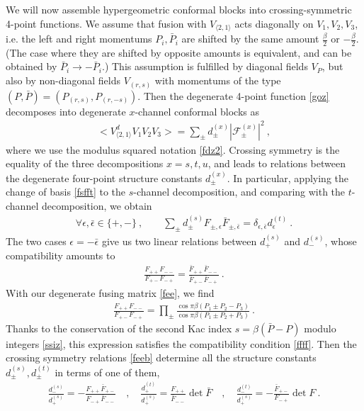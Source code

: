 \documentclass[12pt, a4paper]{article}
\theoremstyle{break}
\begin{document}
We will now assemble hypergeometric conformal blocks into crossing-symmetric 4-point functions. We assume that fusion with $V_{\langle 2,1\rangle}$ acts diagonally on $V_1,V_2,V_3$, i.e. the left and right momentums $P_i,\bar P_i$ are shifted by the same amount $\frac{\beta}{2}$ or $-\frac{\beta}{2}$. (The case where they are shifted by opposite amounts is equivalent, and can be obtained by $\bar P_i\to -\bar P_i$.) This assumption is fulfilled by diagonal fields $V_P$, but also by non-diagonal fields $V_{(r,s)}$ with momentums of the type $(P,\bar P)= (P_{(r,s)},P_{(r,-s)})$. 
Then the degenerate 4-point function \eqref{goz} decomposes into degenerate $x$-channel conformal blocks as 
\begin{align}
 \Big<V_{\langle 2,1\rangle}^dV_{1}V_{2}V_{3}\Big> 
 = \sum_\pm d^{(x)}_\pm \left|\mathcal{F}^{(x)}_\pm \right|^2  
 \ ,
\end{align}
where we use the modulus squared notation \eqref{fdz2}.
Crossing symmetry is the equality of the three decompositions $x=s,t,u$, and leads to relations between the degenerate four-point structure constants $d^{(x)}_\pm$. In particular, applying the change of basis \eqref{fsfft} to the $s$-channel decomposition, and comparing with the $t$-channel decomposition, we obtain 
\begin{align}
 \forall \epsilon,\bar\epsilon \in \{+,-\}\ , \qquad \sum_\pm d_\pm^{(s)} F_{\pm,\epsilon}\bar F_{\pm, \bar\epsilon} = \delta_{\epsilon,\bar\epsilon} d_\epsilon^{(t)}\ . 
 \label{feeb}
\end{align}
The two cases $\epsilon = -\bar\epsilon$ give us two linear relations between $d^{(s)}_+$ and $d^{(s)}_-$, whose compatibility amounts to 
\begin{align}
 \frac{F_{++}F_{--}}{F_{+-}F_{-+}} = \frac{\bar F_{++}\bar F_{--}}{\bar F_{+-}\bar F_{-+}}\ .
 \label{ffff}
\end{align}
With our degenerate fusing matrix \eqref{fee}, we find 
\begin{align}
 \frac{F_{++}F_{--}}{F_{+-}F_{-+}} = \prod_\pm \frac{\cos \pi \beta(P_1\pm P_2-P_3)}{\cos \pi \beta(P_1\pm P_2+P_3)}\ . 
\end{align}
Thanks to the conservation of the second Kac index $s=\beta(\bar P-P)$ modulo integers \eqref{ssiz}, this expression satisfies the compatibility condition \eqref{ffff}. Then the crossing symmetry relations \eqref{feeb} determine all the structure constants $d^{(s)}_\pm,d^{(t)}_\pm$ in terms of one of them,
\begin{align}
 \frac{d^{(s)}_-}{d^{(s)}_+} = -\frac{F_{++}\bar F_{+-}}{F_{-+}\bar F_{--}}\quad , \quad 
 \frac{d^{(t)}_+}{d^{(s)}_+} = \frac{F_{++}}{\bar F_{--}} \det \bar F \quad , \quad 
 \frac{d^{(t)}_-}{d^{(s)}_+} = -\frac{\bar F_{+-}}{F_{-+}} \det F\ .
\end{align}
\end{document}
